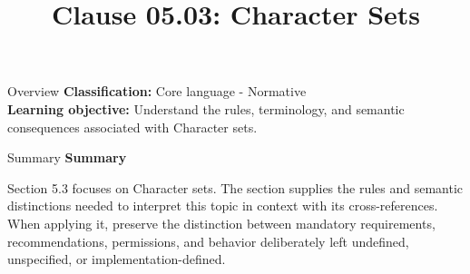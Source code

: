 \documentclass[10pt,letterpaper]{article}
\title{Clause 05.03: Character Sets}
\author{}
\date{}
\begin{document}
\maketitle
\begin{CornellOverviewBox}{Overview}
\textbf{Classification:} Core language - Normative\\[2pt]
\textbf{Learning objective:} Understand the rules, terminology, and semantic consequences associated with Character sets.
\end{CornellOverviewBox}\begin{CornellSummaryBox}{Summary}
{\sffamily\bfseries\color{Accent} Summary}\par\vspace{3pt}Section 5.3 focuses on Character sets. The section supplies the rules and semantic distinctions needed to interpret this topic in context with its cross-references. When applying it, preserve the distinction between mandatory requirements, recommendations, permissions, and behavior deliberately left undefined, unspecified, or implementation-defined.
\end{CornellSummaryBox}
\end{document}
